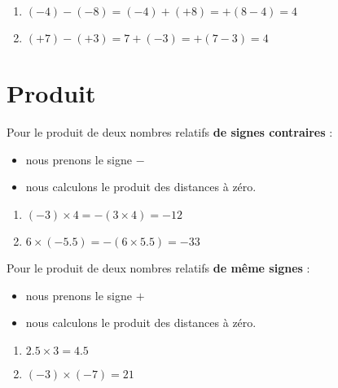 \begin{propriete}
\begin{enumerate}
    \begin{example}
        \begin{enumerate}
            \item
                \( (-4)-(-8)=(-4)+(+8)=+(8-4)=4\)
            \item
                \( (+7)-(+3)=7+(-3)=+(7-3)=4\)
        \end{enumerate}
    \end{example}

    \end{enumerate}
\end{propriete}

\section{Produit}

\begin{propriete}
    Pour le produit de deux nombres relatifs {\bf de signes contraires} :
    \begin{itemize}
        \item nous prenons le signe \( -\)
        \item nous calculons le produit des distances à zéro.
    \end{itemize}

    \begin{example}
        \begin{enumerate}
            \item
                \( (-3)\times 4=-(3\times 4)=-12\)
            \item
                \( 6\times(-5.5)=-(6\times 5.5)=-33\)
        \end{enumerate}
    \end{example}

    Pour le produit de deux nombres relatifs {\bf de même signes} :
    \begin{itemize}
        \item nous prenons le signe \( +\)
        \item nous calculons le produit des distances à zéro.
    \end{itemize}
    
    \begin{example}
        \begin{enumerate}
            \item
                \( 2.5\times 3=4.5\)
            \item
                \( (-3)\times (-7)=21\)
        \end{enumerate}
    \end{example}

\end{propriete}
